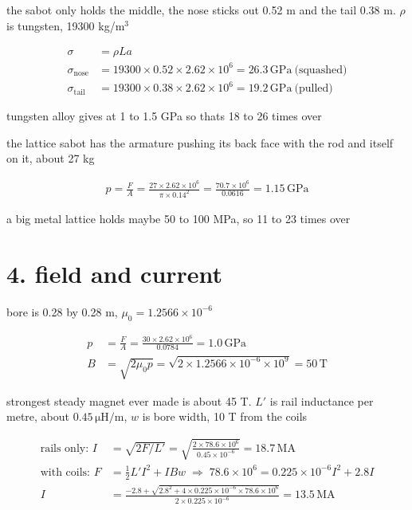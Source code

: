 \documentclass[11pt]{article}
\newcommand{\un}[1]{\,\mathrm{#1}}
\begin{document}
the sabot only holds the middle, the nose sticks out 0.52 m and the tail 0.38 m. $\rho$ is tungsten, 19300 kg/m$^3$

\begin{align*}
\sigma &= \rho L a\\
\sigma_{\text{nose}} &= 19300 \times 0.52 \times 2.62\times10^6 = 26.3\un{GPa}\ \text{(squashed)}\\
\sigma_{\text{tail}} &= 19300 \times 0.38 \times 2.62\times10^6 = 19.2\un{GPa}\ \text{(pulled)}
\end{align*}

tungsten alloy gives at 1 to 1.5 GPa so thats 18 to 26 times over

the lattice sabot has the armature pushing its back face with the rod and itself on it, about 27 kg

\begin{align*}
p = \frac{F}{A} = \frac{27 \times 2.62\times10^6}{\pi \times 0.14^2} = \frac{70.7\times10^6}{0.0616} = 1.15\un{GPa}
\end{align*}

a big metal lattice holds maybe 50 to 100 MPa, so 11 to 23 times over

\section*{4. field and current}

bore is 0.28 by 0.28 m, $\mu_0 = 1.2566\times10^{-6}$

\begin{align*}
p &= \frac{F}{A} = \frac{30 \times 2.62\times10^6}{0.0784} = 1.0\un{GPa}\\
B &= \sqrt{2\mu_0 p} = \sqrt{2 \times 1.2566\times10^{-6} \times 10^9} = 50\un{T}
\end{align*}

strongest steady magnet ever made is about 45 T. $L'$ is rail inductance per metre, about $0.45\un{\mu H/m}$, $w$ is bore width, 10 T from the coils

\begin{align*}
\text{rails only: } I &= \sqrt{2F/L'} = \sqrt{\frac{2\times78.6\times10^6}{0.45\times10^{-6}}} = 18.7\un{MA}\\
\text{with coils: } F &= \tfrac12 L' I^2 + IBw \;\Rightarrow\; 78.6\times10^6 = 0.225\times10^{-6} I^2 + 2.8 I\\
I &= \frac{-2.8 + \sqrt{2.8^2 + 4 \times 0.225\times10^{-6} \times 78.6\times10^6}}{2 \times 0.225\times10^{-6}} = 13.5\un{MA}
\end{align*}
\end{document}
